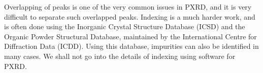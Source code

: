 	Overlapping of peaks is one of the very common issues in PXRD, and it is very difficult to separate such overlapped peaks. Indexing is a much harder work, and is often done using the Inorganic Crystal Structure Database (ICSD) and the Organic Powder Structural Database, maintained by the International Centre for Diffraction Data (ICDD). Using this database, impurities can also be identified in many cases. We shall not go into the details of indexing using software for PXRD.
	